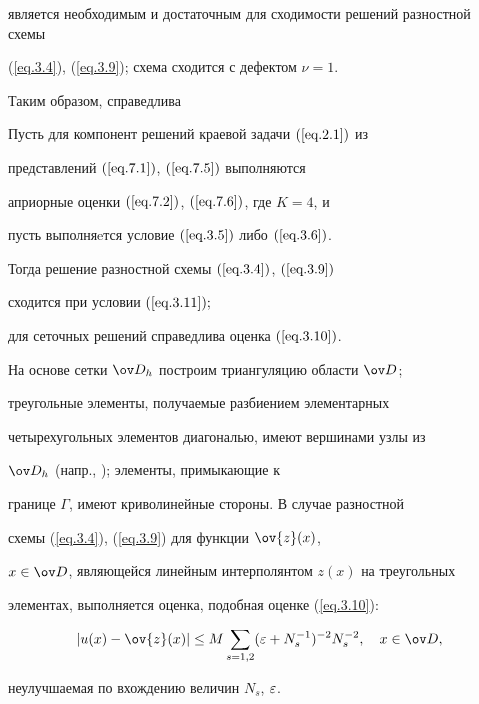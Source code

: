 является необходимым и достаточным для сходимости решений разностной схемы


(\ref{eq.3.4}), (\ref{eq.3.9}); схема сходится с дефектом $\nu=1$. %





Таким образом, справедлива





\begin{thms} \label{t3.1}


Пусть для компонент решений краевой задачи $(\ref{eq.2.1})$ из


представлений $(\ref{eq.7.1})$, $(\ref{eq.7.5})$ выполняются


априорные оценки $(\ref{eq.7.2})$, $(\ref{eq.7.6})$, где $K=4$, и


пусть выполняeтся условие $(\ref{eq.3.5})$ либо $(\ref{eq.3.6})$.


Тогда решение разностной схемы $(\ref{eq.3.4})$, $(\ref{eq.3.9})$


сходится при условии $(\ref{eq.3.11});$


для сеточных решений справедлива оценка $(\ref{eq.3.10})$.


\end{thms}





\begin{notes}\label{r3.1.1} 


На основе сетки $\od_h$ построим триангуляцию области $\od$;


треугольные элементы, получаемые разбиением элементарных


четырехугольных элементов диагональю, имеют вершинами узлы из


$\od_h$ (напр., \cite{11}); элементы, примыкающие к


границе $\varGamma$, имеют криволинейные стороны. В случае разностной


схемы (\ref{eq.3.4}), (\ref{eq.3.9}) для функции $\ov{z}(x)$,


$x\in\od$, являющейся линейным интерполянтом $z(x)$ на треугольных


элементах, выполняется оценка, подобная оценке (\ref{eq.3.10}):


$$




|u(x)-\ov{z}(x)|\leq M\sum_{s=1,2}(\eps+N_s^{-1})^{-2}N_s^{-2},


\quad x\in\od,


$$


неулучшаемая по вхождению величин $N_s$, $\varepsilon$.


\end{notes}








